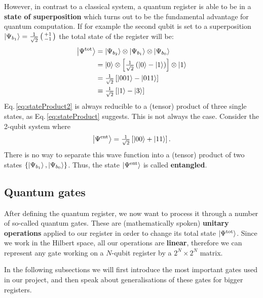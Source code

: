 \documentclass[bibliography=totocnumbered]{article}
\theoremstyle{NoticeStyle}
\begin{document}
However, in contrast to a classical system, a quantum register is able to be in a \textbf{state of superposition} which turns out to be the fundamental advantage for quantum computation. If for example the second qubit is set to a superposition $\ket{\Psi_{b_1}}=\tfrac{1}{\sqrt{2}}\left(\begin{smallmatrix}
+1\\-1
\end{smallmatrix}\right)$ the total state of the register will be:
%
\begin{align}
	\ket{\Psi^\text{tot}} &= \ket{\Psi_{b_2}} \otimes \ket{\Psi_{b_1}} \otimes \ket{\Psi_{b_0}}\label{eq:stateProduct}\\
			   &= \ket{0} \otimes \left[ \tfrac{1}{\sqrt{2}} \left(\ket{0} - \ket{1}\right) \right] \otimes \ket{1}\\
			   &= \tfrac{1}{\sqrt{2}} \left[ \ket{001} - \ket{011}   \right]\\
			   &\equiv \tfrac{1}{\sqrt{2}} \left[ \ket{1} - \ket{3}   \right]\label{eq:stateProduct2}
\end{align} 
%
Eq.\,\ref{eq:stateProduct2} is always reducible to a (tensor) product of three single states, as Eq.\,\ref{eq:stateProduct} suggests. This is not always the case. Consider the 2-qubit system where
%
\begin{align}
	\ket{\Psi^\text{ent}} = \tfrac{1}{\sqrt{2}}  \left[ \ket{00} + \ket{11} \right].
\end{align}
%
There is no way to separate this wave function into a (tensor) product of two states
$\{ \ket{\Psi_{b_1}}, \ket{\Psi_{b_0}} \}$. Thus, the state $\ket{\Psi^\text{ent}}$ is called \textbf{entangled}.

\subsection{Quantum gates}\label{sec:Quantum gates}
After defining the quantum register, we now want to process it through a number of so-called quantum gates. These are (mathematically spoken) \textbf{unitary operations} applied to our register in order to change its total state $\ket{\Psi^\text{tot}}$. Since we work in the Hilbert space, all our operations are \textbf{linear}, therefore we can represent any gate working on a $N$-qubit register by a $2^N \times 2^N$ matrix.

In the following subsections we will first introduce the most important gates used in our project, and then speak about generalisations of these gates for bigger registers.
\end{document}
